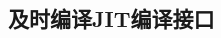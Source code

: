 \documentclass[class=book, crop=false]{standalone}
\begin{document}
\begin{CJK}{UTF8}{gbsn}

\chapter{及时编译JIT编译接口}











\cleardoublepage

\end{CJK}
\end{document}
